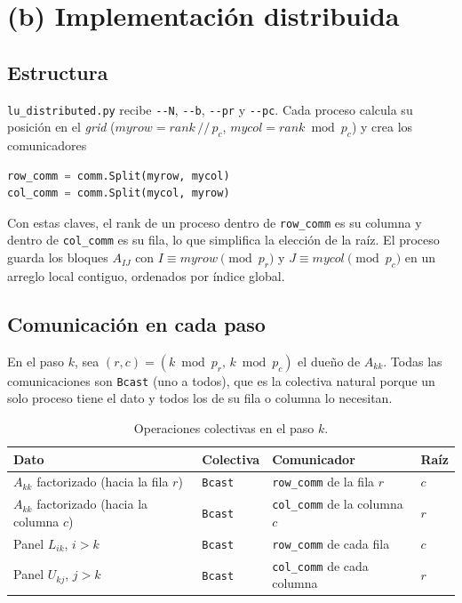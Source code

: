 \documentclass[11pt,a4paper]{article}
\begin{document}
\section{(b) Implementación distribuida}
\subsection{Estructura}
\texttt{lu\_distributed.py} recibe \texttt{-{}-N}, \texttt{-{}-b}, \texttt{-{}-pr} y \texttt{-{}-pc}. Cada proceso calcula su posición en el \emph{grid} ($\textit{myrow}=\textit{rank}\,/\!/\,p_c$, $\textit{mycol}=\textit{rank}\bmod p_c$) y crea los comunicadores
\begin{lstlisting}[language=Python]
row_comm = comm.Split(myrow, mycol)
col_comm = comm.Split(mycol, myrow)
\end{lstlisting} Con estas claves, el rank de un proceso dentro de \texttt{row\_comm} es su columna y dentro de \texttt{col\_comm} es su fila, lo que simplifica la elección de la raíz. El proceso guarda los bloques $A_{IJ}$ con $I\equiv\textit{myrow}\pmod{p_r}$ y $J\equiv\textit{mycol}\pmod{p_c}$ en un arreglo local contiguo, ordenados por índice global.

\subsection{Comunicación en cada paso}
En el paso $k$, sea $(r,c)=(k\bmod p_r,\,k\bmod p_c)$ el dueño de $A_{kk}$. Todas las comunicaciones son \texttt{Bcast} (uno a todos), que es la colectiva natural porque un solo proceso tiene el dato y todos los de su fila o columna lo necesitan.

\begin{table}[H]
\centering\small
\caption{Operaciones colectivas en el paso $k$.}
\label{tab:colectivas}
\begin{tabular}{llll}
\toprule
\textbf{Dato} & \textbf{Colectiva} & \textbf{Comunicador} & \textbf{Raíz} \\
\midrule
$A_{kk}$ factorizado (hacia la fila $r$) & \texttt{Bcast} & \texttt{row\_comm} de la fila $r$ & $c$ \\
$A_{kk}$ factorizado (hacia la columna $c$) & \texttt{Bcast} & \texttt{col\_comm} de la columna $c$ & $r$ \\
Panel $L_{ik}$, $i>k$ & \texttt{Bcast} & \texttt{row\_comm} de cada fila & $c$ \\
Panel $U_{kj}$, $j>k$ & \texttt{Bcast} & \texttt{col\_comm} de cada columna & $r$ \\
\bottomrule
\end{tabular}
\end{table}
\end{document}
